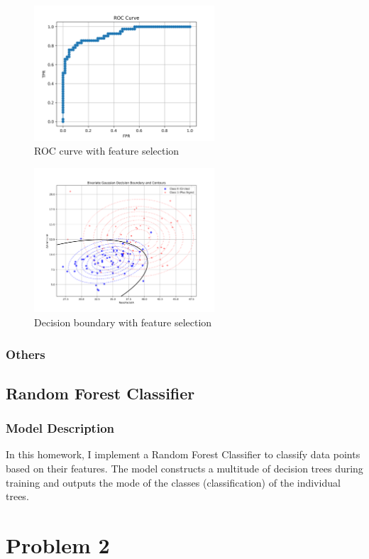 \documentclass[12pt,a4paper]{article}
\begin{document}
\begin{figure}[H]
    \centering
    \includegraphics[width=0.6\textwidth]{src/roc_curve.png}
    \caption{ROC curve with feature selection}
    \label{fig:roc_fs}
\end{figure}

\begin{figure}[H]
    \centering
    \includegraphics[width=0.6\textwidth]{src/decision_boundary_plot.png}
    \caption{Decision boundary with feature selection}
    \label{decision_boundary_fs}
\end{figure}

\subsubsection{Others}

\subsection{Random Forest Classifier}
\subsubsection{Model Description}
In this homework, I implement a Random Forest Classifier to classify data points based on their features. The model constructs a multitude of decision trees during training and outputs the mode of the classes (classification) of the individual trees.

\section{Problem 2}
\end{document}
